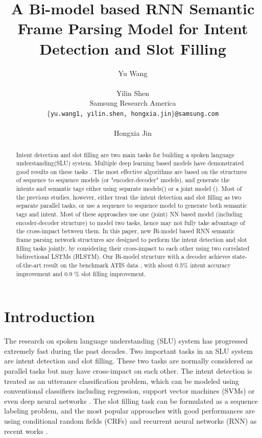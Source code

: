 \documentclass[11pt,a4paper]{article}
\title{A Bi-model based RNN Semantic Frame Parsing Model for Intent Detection and Slot Filling}
\author{Yu Wang \\
  \\\And
  Yilin Shen \\
  Samsung Research America  \\
  {\tt $\lbrace$yu.wang1, yilin.shen, hongxia.jin$\rbrace$@samsung.com} \\
  \\\And
  Hongxia Jin \\
  }
\date{}
\begin{document}
\maketitle
\begin{abstract}
Intent detection and slot filling are two main tasks for building a spoken language understanding(SLU) system. Multiple deep learning based models have demonstrated good results on these tasks . The most effective algorithms are based on the structures of sequence to sequence models (or "encoder-decoder" models), and generate the intents and semantic tags either using separate models(\cite{yao2014spoken,mesnil2015using,peng2015recurrent,kurata2016leveraging,hahn2011comparing}) or a joint model (\cite{liu2016attention,hakkani2016multi, guo2014joint}). Most of the previous studies, however, either treat the intent detection and slot filling as two separate parallel tasks, or use a sequence to sequence model to generate both semantic tags and intent. Most of these approaches use one (joint) NN based model (including encoder-decoder structure) to model two tasks, hence may not fully take advantage of the cross-impact between them. In this paper, new Bi-model based RNN semantic frame parsing network structures are designed to perform the intent detection and slot filling tasks jointly, by considering their cross-impact to each other using two correlated bidirectional LSTMs (BLSTM). Our Bi-model structure with a decoder achieves state-of-the-art result on the benchmark ATIS data \cite{hemphill1990atis,tur2010left}, with about 0.5$\%$ intent accuracy improvement and 0.9 $\%$ slot filling improvement.
\end{abstract}

\section{Introduction}
The research on spoken language understanding (SLU) system has progressed extremely fast during the past decades. Two important tasks in an SLU system are intent detection and slot filling. These two tasks are normally considered as parallel tasks but may have cross-impact on each other. The intent detection is treated as an utterance classification problem, which can be modeled using conventional classifiers including regression, support vector machines (SVMs) or even deep neural networks \cite{haffner2003optimizing, sarikaya2011deep}.
The slot filling task can be formulated as a sequence labeling problem, and the most popular approaches with good performances are using conditional random fields (CRFs) and recurrent neural networks (RNN) as recent works \cite{xu2013convolutional}. 
\end{document}
